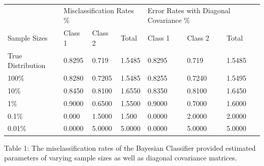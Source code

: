 \documentclass[ 12pt ]{article}
\begin{document}
\begin{enumerate}
\begin{enumerate}
\begin{center}
                \begin{tabular}{|l|lll|lll|}
                    \hline
                    & \multicolumn{3}{l|}{Misclassification Rates \%} & \multicolumn{3}{l|}{Error Rates with Diagonal Covariance \%} \\
                    Sample Sizes & Class 1 & Class 2 & Total & Class 1 & Class 2 & Total \\
                    \hline
                    True Distribution & 0.8295 & 0.719 & 1.5485 & 0.8295 & 0.719 & 1.5485 \\
                    100\% & 0.8280 & 0.7205 & 1.5485 & 0.8255 & 0.7240 & 1.5495 \\
                    10\% & 0.8450 & 0.8100 & 1.6550 & 0.8350 & 0.8100 & 1.6450 \\
                    1\% & 0.9000 & 0.6500 & 1.5500 & 0.9000 & 0.7000 & 1.6000 \\
                    0.1\% & 0.000 & 1.5000 & 1.500 & 0.0000 & 2.0000 & 2.0000 \\
                    0.01\% & 0.0000 & 5.0000 & 5.0000 & 0.0000 & 5.0000 & 5.0000 \\
                    \hline
                \end{tabular}
        \scriptsize
                    Table 1: The misclassification rates of the Bayesian Classifier provided estimated parameters of varying sample sizes as well as diagonal covariance matrices.
\end{center}

\begin{center}
                

\end{center}
\end{enumerate}
\end{enumerate}
\end{document}
